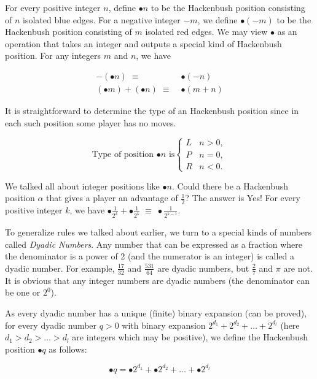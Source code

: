 \documentclass[12pt,a4paper,hidelinks]{report}
\begin{document}
For every positive integer $n$, define $\bullet n$ to be the Hackenbush position consisting of $n$ isolated blue edges. For a negative integer $-m$, we define $\bullet (-m)$ to be the Hackenbush position consisting of $m$ isolated red edges. We may view $\bullet$ as an operation that takes an integer and outputs a special kind of Hackenbush position.
For any integers $m$ and $n$, we have

\begin{align}
  - (\bullet n) \; \equiv \;             & \bullet (-n)  \\
  (\bullet m) + (\bullet n) \; \equiv \; & \bullet (m+n)
\end{align}

It is straightforward to determine the type of an Hackenbush position since in each such position some player has no moves.

\begin{equation}
  \text{Type of position $\bullet n$ is}
  \begin{cases}
    L & n > 0, \\
    P & n = 0, \\
    R & n < 0.
  \end{cases}
\end{equation}

We talked all about integer positions like $\bullet n$. Could there be a Hackenbush position $\alpha$ that gives a player an advantage of $\frac{1}{2}$? The answer is Yes! For every positive integer $k$, we have $\bullet \frac{1}{2^k} + \bullet \frac{1}{2^k} \; \equiv \; \bullet \frac{1}{2^{k-1}}$.
\par
To generalize rules we talked about earlier, we turn to a special kinds of numbers called \textit{Dyadic Numbers}. Any number that can be expressed as a fraction where the denominator is a power of 2 (and the numerator is an integer) is called a dyadic number. For example, $\frac{17}{32}$ and $\frac{531}{64}$ are dyadic numbers, but $\frac{2}{7}$ and $\pi$ are not. It is obvious that any integer numbers are dyadic numbers (the denominator can be one or $2^0$).
\par
As every dyadic number has a unique (finite) binary expansion (can be proved), for every dyadic number $q > 0$ with binary expansion $2^{d_1} + 2^{d_2} + \dots + 2^{d_l}$ (here $d_1 > d_2 > \dots > d_l$ are integers which may be positive), we define the Hackenbush position $\bullet q$ as follows:

\begin{equation}
  \bullet q = \bullet 2^{d_1} + \bullet 2^{d_2} + \dots + \bullet 2^{d_l}
\end{equation}
\end{document}
